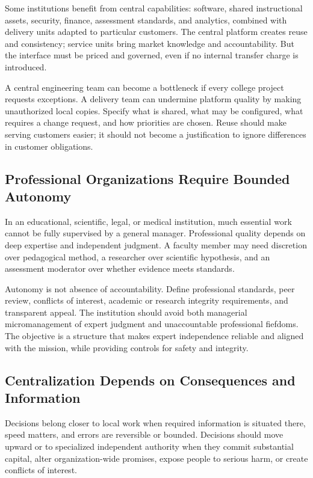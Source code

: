 Some institutions benefit from central capabilities: software, shared instructional assets, security, finance, assessment standards, and analytics, combined with delivery units adapted to particular customers. The central platform creates reuse and consistency; service units bring market knowledge and accountability. But the interface must be priced and governed, even if no internal transfer charge is introduced.

A central engineering team can become a bottleneck if every college project requests exceptions. A delivery team can undermine platform quality by making unauthorized local copies. Specify what is shared, what may be configured, what requires a change request, and how priorities are chosen. Reuse should make serving customers easier; it should not become a justification to ignore differences in customer obligations.

\subsection{Professional Organizations Require Bounded Autonomy}
\label{sec:professional_bounded_autonomy}

In an educational, scientific, legal, or medical institution, much essential work cannot be fully supervised by a general manager. Professional quality depends on deep expertise and independent judgment. A faculty member may need discretion over pedagogical method, a researcher over scientific hypothesis, and an assessment moderator over whether evidence meets standards.

Autonomy is not absence of accountability. Define professional standards, peer review, conflicts of interest, academic or research integrity requirements, and transparent appeal. The institution should avoid both managerial micromanagement of expert judgment and unaccountable professional fiefdoms. The objective is a structure that makes expert independence reliable and aligned with the mission, while providing controls for safety and integrity.

\subsection{Centralization Depends on Consequences and Information}
\label{sec:centralization_consequences_information}

Decisions belong closer to local work when required information is situated there, speed matters, and errors are reversible or bounded. Decisions should move upward or to specialized independent authority when they commit substantial capital, alter organization-wide promises, expose people to serious harm, or create conflicts of interest.


